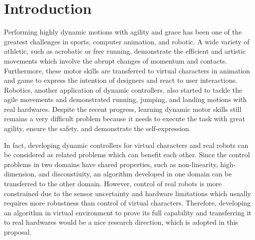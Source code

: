 \chapter{Introduction}

\cite{fitts:1967:hp}

Performing highly dynamic motions with agility and grace has been
one of the greatest challenges in sports, computer animation, and robotic.
A wide variety of athletic, such as acrobatic or free running, demonstrate the
efficient and artistic movements which involve the abrupt changes of momentum
and contacts.
Furthermore, these motor skills are transferred to virtual characters 
in animation and game to express the intention of designers
and react to user interactions.
Robotics, another application of dynamic controllers, also started 
to tackle the agile movements and demonstrated
running, jumping, and landing motions with real hardwares.
Despite the recent progress, 
learning dynamic motor skills still remains a very difficult
problem because it needs to execute the task with great agility, 
ensure the safety, and demonstrate the self-expression.

In fact, developing dynamic controllers for virtual characters and
real robots can be considered as related problems
which can benefit each other.
Since the control problems in two domains have shared properties,
such as non-linearity, high-dimension, and disconstiuity,
an algorithm developed in one domain can be transferred 
to the other domain.
However, control of real robots is more constrained
due to the sensor uncertainty and hardware limitations which 
usually requires more robustness than control of virtual
characters.
Therefore, developing an algorithm in virtual environment to prove its
full capability and transferring it to real hardwares would be
a nice research direction, which is adopted in this proposal.

